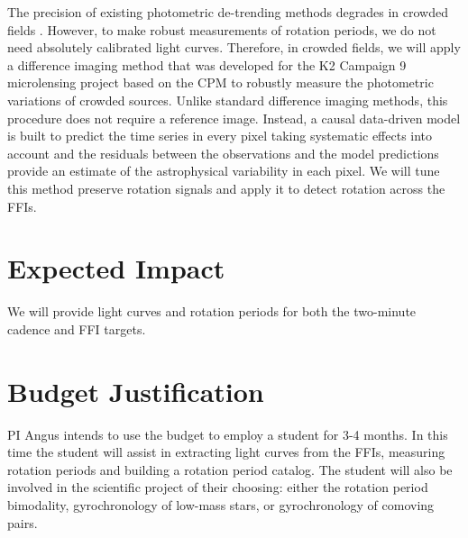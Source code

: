 \documentclass[useAMS, usenatbib, preprint, 12pt]{aastex}
\begin{document}
The precision of existing photometric de-trending methods degrades in crowded
fields \citep[for example,][]{luger2017}.
However, to make robust measurements of rotation periods, we do not need
absolutely calibrated light curves.
Therefore, in crowded fields, we will apply a difference imaging method that
was developed for the K2 Campaign 9 microlensing project \citep{henderson2016}
based on the \textsf{CPM} \citep{wang2016} to robustly measure the photometric
variations of crowded sources.
Unlike standard difference imaging methods, this procedure does not require a
reference image.
Instead, a causal data-driven model is built to predict the time series in
every pixel taking systematic effects into account and the residuals between
the observations and the model predictions provide an estimate of the
astrophysical variability in each pixel.
We will tune this method preserve rotation signals and apply it to detect
rotation across the FFIs.



\section{Expected Impact}
We will provide light curves and rotation periods for both the two-minute
cadence and FFI targets.

\section{Budget Justification}
PI Angus intends to use the budget to employ a student for 3-4 months.
In this time the student will assist in extracting light curves from the FFIs,
measuring rotation periods and building a rotation period catalog.
The student will also be involved in the scientific project of their choosing:
either the rotation period bimodality, gyrochronology of low-mass stars, or
gyrochronology of comoving pairs.


\end{document}
